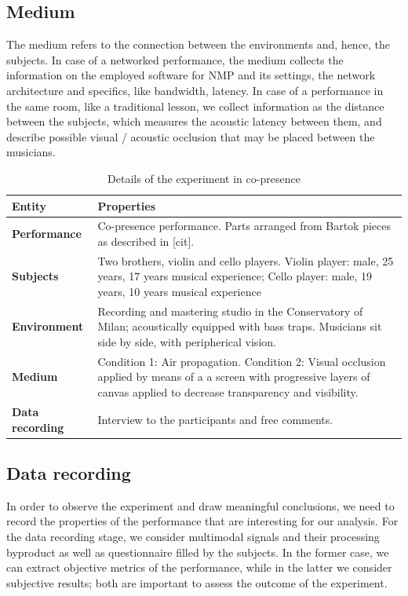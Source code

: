 \documentclass[conference]{IEEEtran}
\begin{document}
\subsection{Medium}
The medium refers to the connection between the environments and, hence, the subjects. In case of a networked performance, the medium collects the information on the employed software for NMP and its settings, the network architecture and specifics, like bandwidth, latency. In case of a performance in the same room, like a traditional lesson, we collect information as the distance between the subjects, which measures the acoustic latency between them, and describe possible visual / acoustic occlusion that may be placed between the musicians. 


\begin{table}
	\centering
	\caption{Details of the experiment in co-presence}
	\begin{tabular}{p{1.5cm}p{6cm}}
		\hline
		\textbf{Entity} & \textbf{Properties} \\
		\hline
		\textbf{Performance} & Co-presence performance. \newline Parts arranged from Bartok pieces as described in [cit]. \\
		\textbf{Subjects} & Two brothers, violin and cello players. \newline Violin player: male, 25 years, 17 years musical experience; 	\newline Cello player: male, 19 years, 10 years  musical experience \\
		\textbf{Environment} & Recording and mastering studio in the Conservatory of Milan; acoustically equipped with bass traps. \newline Musicians sit side by side, with peripherical vision.\\
		\textbf{Medium} & Condition 1: Air propagation. \newline Condition 2: Visual occlusion applied by means of a a screen with progressive layers of canvas applied to decrease transparency and visibility. \\
		\textbf{Data} \newline \textbf{recording}  & Interview to the participants and free comments.\\
		\hline
	\end{tabular}
	\label{tab:exp1}
\end{table}


\subsection{Data recording}
In order to observe the experiment and draw meaningful conclusions, we need to record the properties of the performance that are interesting for our analysis. For the data recording stage, we consider multimodal signals and their processing byproduct as well as questionnaire filled by the subjects. In the former case, we can extract objective metrics of the performance, while in the latter we consider subjective results; both are important to assess the outcome of the experiment. 
\end{document}
